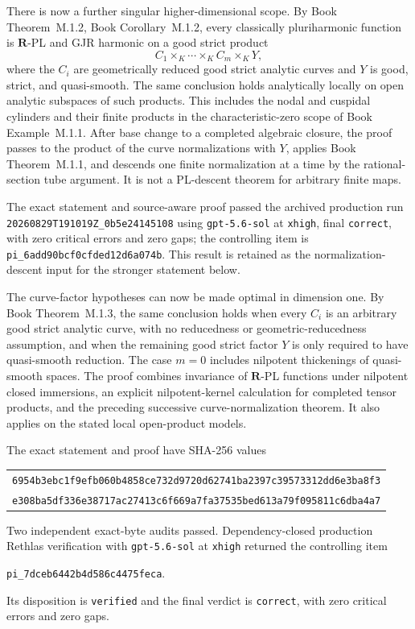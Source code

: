 \documentclass[11pt,a4paper]{article}
\theoremstyle{definition}
\theoremstyle{remark}
\begin{document}
There is now a further singular higher-dimensional scope.  By
Book Theorem~M.1.2, Book Corollary~M.1.2, every classically pluriharmonic
function is \(\mathbf R\)-PL and GJR harmonic on a good strict product
\[
             C_1\times_K\cdots\times_K C_m\times_K Y,
\]
where the \(C_i\) are geometrically reduced good strict analytic curves and
\(Y\) is good, strict, and quasi-smooth.  The same conclusion holds
analytically locally on open analytic subspaces of such products.  This
includes the nodal and cuspidal cylinders and their finite products in the
characteristic-zero scope of Book Example~M.1.1.
After base change to a completed algebraic closure, the proof passes to the
product of the curve normalizations with \(Y\), applies
Book Theorem~M.1.1, and descends one finite normalization at
a time by the rational-section tube argument.  It is not a PL-descent
theorem for arbitrary finite maps.

The exact statement and source-aware proof passed the archived production
run \nolinkurl{20260829T191019Z_0b5e24145108} using
\texttt{gpt-5.6-sol} at \texttt{xhigh}, final \texttt{correct}, with zero
critical errors and zero gaps; the controlling item is
\nolinkurl{pi_6add90bcf0cfded12d6a074b}.  This result is retained as the
normalization-descent input for the stronger statement below.

The curve-factor hypotheses can now be made optimal in dimension one.  By
Book Theorem~M.1.3, the same conclusion holds
when every \(C_i\) is an arbitrary good strict analytic curve, with no
reducedness or geometric-reducedness assumption, and when the remaining
good strict factor \(Y\) is only required to have quasi-smooth reduction.
The case \(m=0\) includes nilpotent thickenings of quasi-smooth spaces.  The
proof combines invariance of \(\mathbf R\)-PL functions under nilpotent
closed immersions, an explicit nilpotent-kernel calculation for completed
tensor products, and the preceding successive curve-normalization theorem.
It also applies on the stated local open-product models.

The exact statement and proof have SHA-256 values
\begin{center}
\small
\begin{tabular}{@{}c@{}}
\nolinkurl{6954b3ebc1f9efb060b4858ce732d9720d62741ba2397c39573312dd6e3ba8f3}\\
\nolinkurl{e308ba5df336e38717ac27413c6f669a7fa37535bed613a79f095811c6dba4a7}
\end{tabular}
\end{center}
Two independent exact-byte audits passed.  Dependency-closed production
Rethlas verification with \texttt{gpt-5.6-sol} at \texttt{xhigh} returned
the controlling item
\begin{center}
\small
\nolinkurl{pi_7dceb6442b4d586c4475feca}.
\end{center}
Its disposition is \texttt{verified} and the final verdict is
\texttt{correct}, with zero critical errors and zero gaps.
\end{document}
